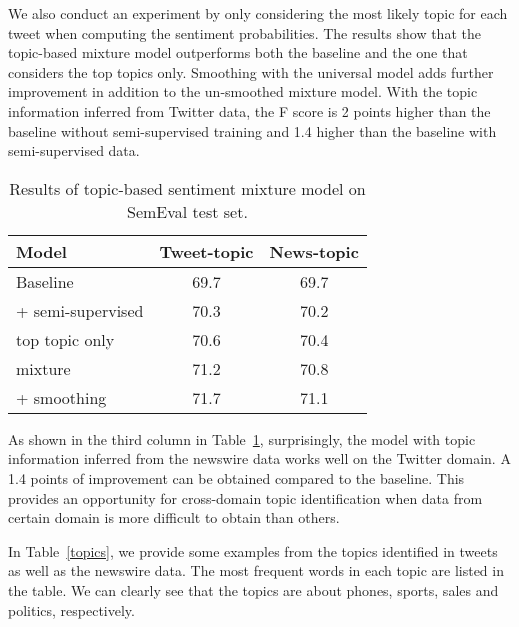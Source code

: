 \documentclass[11pt]{article}
\begin{document}
We also conduct an experiment by only considering the most likely topic for each tweet when computing the sentiment
probabilities. The results show that the topic-based mixture model outperforms both the baseline and the one
that considers the top topics only. Smoothing with the universal model adds further improvement in addition to
the un-smoothed mixture model. With the topic information inferred from Twitter data, the F score is 2 points 
higher than the baseline without semi-supervised training and 1.4 higher than the baseline with semi-supervised data. 

\begin{table}[t]
\begin{center}
\begin{tabular}{|l|c|c|} \hline 
\bf Model  & \bf Tweet-topic & \bf News-topic \\ \hline\hline
Baseline          & 69.7 & 69.7 \\ \hline
+ semi-supervised & 70.3 & 70.2 \\ \hline\hline
top topic only    & 70.6 & 70.4 \\ \hline
mixture           & 71.2 & 70.8 \\ \hline
+ smoothing       & 71.7 & 71.1 \\ \hline
\end{tabular}
\end{center}
\caption{\label{mixture} Results of topic-based sentiment mixture model on SemEval test set.}
\end{table}

As shown in the third column in Table~\ref{mixture}, surprisingly, the model with topic information inferred from the newswire 
data works well on the Twitter domain. A 1.4 points of improvement can be obtained compared to the baseline.
This provides an opportunity for cross-domain topic identification when data from certain domain is more difficult 
to obtain than others.

In Table~\ref{topics}, we provide some examples from the topics identified in tweets as well as the newswire
data. The most frequent words in each topic are listed in the table. We can clearly see that the topics are about
phones, sports, sales and politics, respectively.
\end{document}
